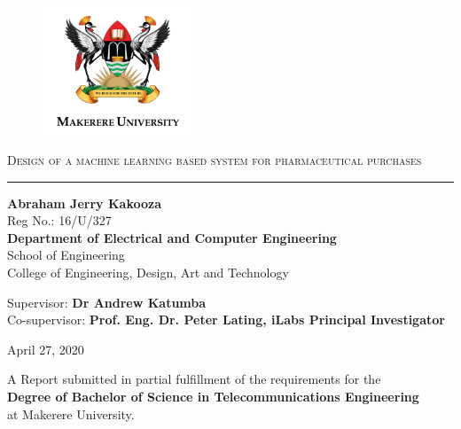 \documentclass[12pt]{report}
\begin{document}
\begin{titlepage}
\centering

\begin{figure}[H]
\centering
\includegraphics[width=0.4\textwidth]{MAK_Logo2_png.png}%
\end{figure}


\textsc{}


{\huge \textsc{Design of a machine learning based system for pharmaceutical purchases}  \\}
\rule{3in}{0.4pt}


{\Large\textbf{Abraham Jerry Kakooza}	 \\}
Reg No.: 16/U/327\\ \vspace{2cm}
{\large \textbf{Department of Electrical and Computer Engineering} \\
School of Engineering \\
College of Engineering, Design, Art and Technology}




{
Supervisor: \textbf{Dr Andrew Katumba}    \\
Co-supervisor: \textbf{Prof. Eng. Dr. Peter Lating, iLabs Principal Investigator} }


April 27, 2020


{
A Report submitted in partial fulfillment of the requirements for the \\ \textbf{ Degree of Bachelor of Science in Telecommunications Engineering} \\ at Makerere University. }


\end{titlepage}
\end{document}
